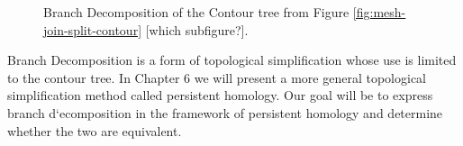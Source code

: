\begin{figure}%
    \centering
    \caption{Branch Decomposition of the Contour tree from Figure \ref{fig:mesh-join-split-contour} [which subfigure?].}%
    \label{fig:branch-decomp}%
\end{figure}

Branch Decomposition is a form of topological simplification whose use is limited to the contour tree. In Chapter 6 we will present a more general topological simplification method called persistent homology. Our goal will be to express branch d`ecomposition in the framework of persistent homology and determine whether the two are equivalent.


